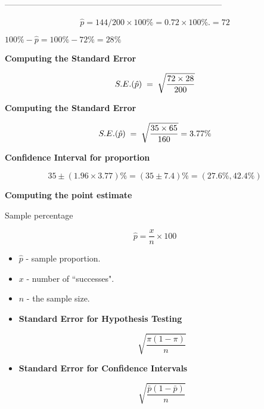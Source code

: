\documentclass[]{report}
\begin{document}
%
------------------------------------------------------------------------------%

{
\[
\hat{p} = {144/200}  \times 100\%  = 0.72 \times 100\%.  = 72%
\]

$100\% - \hat{p} = 100\% - 72\% = 28\% $

}


{
\textbf{Computing the Standard Error}

\[
S.E. (\hat{p}) \;=\; \sqrt{ {72 \times 28 \over 200 }}
\]


}

\newpage

\bigskip
\textbf{Computing the Standard Error}

\[
S.E. (\hat{p}) \;=\; \sqrt{ {35 \times 65 \over 160 }} =  3.77\%
\] \bigskip

\textbf{Confidence Interval for proportion}

\[
35 \pm (1.96 \times 3.77) \%  = (35 \pm7.4) \% = (27.6\%,42.4\%)
\]

\newpage


{
\textbf{Computing the point estimate}

Sample percentage

\[
\hat{p} = \frac{x}{n} \times 100%
\]

\begin{itemize}
\item $\hat{p}$ - sample proportion.
\item $x$  - number of ``successes".
\item $n$  - the sample size.
\end{itemize}

}




\begin{framed}
\begin{itemize}
\item \textbf{Standard Error for Hypothesis Testing}

\[\sqrt{\frac{\pi (1- \pi)}{n}}\]

\item \textbf{Standard Error for Confidence Intervals}


\[\sqrt{\frac{\bar{p} (1- \bar{p})}{n}}\]
\end{itemize}
\end{framed}
\end{document}

